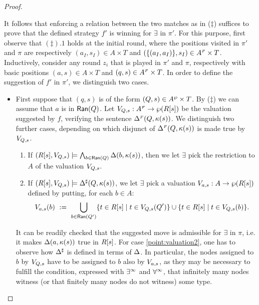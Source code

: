 \begin{proof}
\begin{enumerate}[(i)]
It follows that enforcing a relation between the two matches as in ($\ddag$) suffices to prove that the defined strategy $f'$ is winning for $\exists$ in $\pi'$. For this purpose, first observe that $(\ddag).1$ holds at the initial round, where the positions visited in $\pi'$ and $\pi$ are respectively $(a_I,s_I) \in A \times T$ and $(\{(a_I,a_I)\},s_I) \in A^{{\scriptscriptstyle F}} \times T$. Inductively, consider any round $z_i$ that is played in $\pi'$ and $\pi$, respectively with basic positions $(a,s) \in A \times T$ and $(q,s) \in A^{{\scriptscriptstyle F}} \times T$. In order to define the suggestion of $f'$ in $\pi'$, we distinguish two cases.
\begin{itemize}
  \item First suppose that $(q,s)$ is of the form $(Q,s) \in
  A^{\wp}\times T$. By ($\ddag$) we can assume that $a$ is in $\mathsf{Ran}(Q)$. Let $V_{Q,s} :A^{{\scriptscriptstyle F}} \rightarrow \wp(R[s])$ be the valuation suggested by $f$, verifying the sentence $\Delta^{{\scriptscriptstyle F}}(Q,\kappa(s))$. We distinguish two further cases, depending on which disjunct of $\Delta^{{\scriptscriptstyle F}}(Q,\kappa(s))$ is made true by $V_{Q,s}$.
      \begin{enumerate}[label=(\roman*), ref=\roman*]
        \item If $(R[s],V_{Q,s})\models \bigwedge_{b \in \mathsf{Ran}(Q)} \Delta(b,\kappa(s))$, then we let $\exists$ pick the restriction to $A$ of the valuation $V_{Q,s}$. \label{point:valuation1}
        \item If $(R[s],V_{Q,s})\models \Delta^{\sharp}(Q,\kappa(s))$, we let $\exists$ pick a valuation $V_{a,s}:A \rightarrow \wp (R[s])$ defined by putting, for each $b \in A$:
            \begin{align*}
               V_{a,s}(b)\ :=\ \bigcup_{b \in \mathsf{Ran}(Q')} \{t \in R[s] \mid t \in V_{Q,s}(Q')\} 
               \cup  \{t \in R[s] \mid t \in V_{Q,s}(b)\} .
            \end{align*} \label{point:valuation2}
      \end{enumerate}
      It can be readily checked that the suggested move is admissible for $\exists$ in $\pi$, i.e. it makes $\Delta(a,\kappa(s))$ true in $R[s]$. For case \eqref{point:valuation2}, one has to observe how $\Delta^{\sharp}$ is defined in terms of $\Delta$. In particular, the nodes assigned to $b$ by $V_{Q,s}$ have to be assigned to $b$ also by $V_{a,s}$, as they may be necessary to fulfill the condition, expressed with $\exists^\infty$ and $\forall^\infty$, that infinitely many nodes witness (or that finitely many nodes do not witness) some type.


\end{itemize}
\end{enumerate}
\end{proof}

